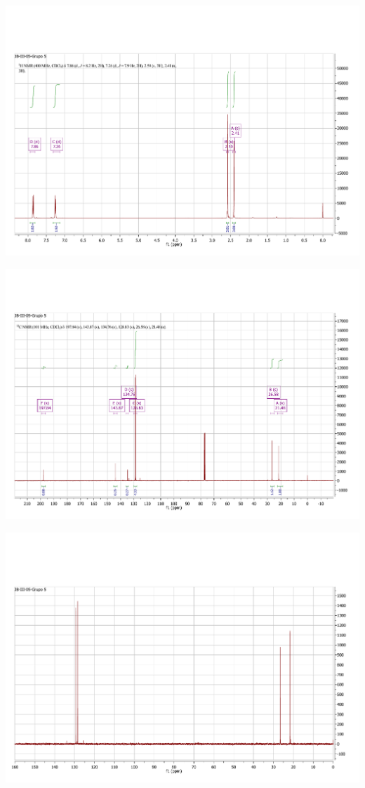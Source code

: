 \documentclass[fleqn,11pt]{SelfArx}
\begin{document}
{
	\begin{minipage}{0.9\textheight}
		\centering
		\includegraphics[height=0.7\textheight]{RMN/HRMN.pdf}
		\label{HRMN}
	\end{minipage}
}

{
	\begin{minipage}{\textheight}
		\centering
		\includegraphics[height=0.7\textheight]{RMN/CRMN.pdf}
		\label{CRMN}
	\end{minipage}
}

{
	\begin{minipage}{\textheight}
		\centering
		\includegraphics[height=0.7\textheight]{RMN/DEPTRMN.pdf}
		\label{DEPT}
	\end{minipage}
}
\end{document}
